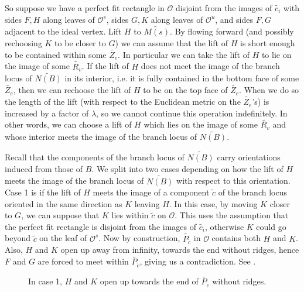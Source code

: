 \documentclass[12pt]{amsart}
\theoremstyle{definition}
\numberwithin{equation}{section}
\begin{document}
So suppose we have a perfect fit rectangle in $\mathcal{O}$ disjoint from the images of $\widetilde{c_i}$ with sides $F,H$ along leaves of $\mathcal{O}^s$, sides $G,K$ along leaves of $\mathcal{O}^u$, and sides $F,G$ adjacent to the ideal vertex. Lift $H$ to $\widetilde{M(s)}$. By flowing forward (and possibly rechoosing $K$ to be closer to $G$) we can assume that the lift of $H$ is short enough to be contained within some $\widetilde{Z_e}$. In particular we can take the lift of $H$ to lie on the image of some $\widetilde{R_v}$. If the lift of $H$ does not meet the image of the branch locus of $\widetilde{N(B)}$ in its interior, i.e. it is fully contained in the bottom face of some $\widetilde{Z_e}$, then we can rechoose the lift of $H$ to be on the top face of $\widetilde{Z_e}$. When we do so the length of the lift (with respect to the Euclidean metric on the $\widetilde{Z_e}$'s) is increased by a factor of $\lambda$, so we cannot continue this operation indefinitely. In other words, we can choose a lift of $H$ which lies on the image of some $\widetilde{R_v}$ and whose interior meets the image of the branch locus of $\widetilde{N(B)}$.

Recall that the components of the branch locus of $\widetilde{N(B)}$ carry orientations induced from those of $B$. We split into two cases depending on how the lift of $H$ meets the image of the branch locus of $\widetilde{N(B)}$ with respect to this orientation. Case 1 is if the lift of $H$ meets the image of a component $\widetilde{c}$ of the branch locus oriented in the same direction as $K$ leaving $H$. In this case, by moving $K$ closer to $G$, we can suppose that $K$ lies within $\widetilde{c}$ on $\mathcal{O}$. This uses the assumption that the perfect fit rectangle is disjoint from the images of $\widetilde{c_i}$, otherwise $K$ could go beyond $\widetilde{c}$ on the leaf of $\mathcal{O}^s$. Now by construction, $\widetilde{P_{\widetilde{c}}}$ in $\mathcal{O}$ contains both $H$ and $K$. Also, $H$ and $K$ open up away from infinity, towards the end without ridges, hence $F$ and $G$ are forced to meet within $\widetilde{P_{\widetilde{c}}}$, giving us a contradiction. See .

\begin{figure}
    \centering
    \resizebox{!}{4cm}{}
    \caption{In case 1, $H$ and $K$ open up towards the end of $\widetilde{P_{\widetilde{c}}}$ without ridges.}
    \label{fig:perfectfitarg1}
\end{figure}
\end{document}
